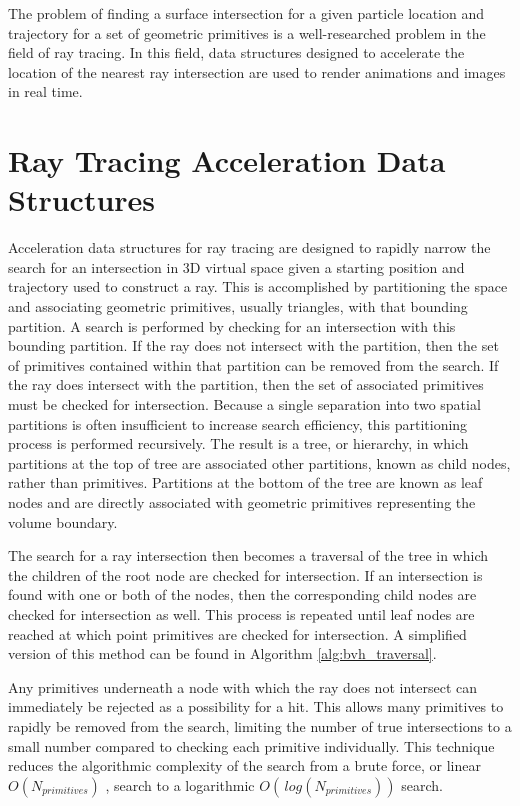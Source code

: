 The problem of finding a surface intersection for a given particle location and
trajectory for a set of geometric primitives is a well-researched problem in
the field of ray tracing. In this field, data structures designed to accelerate
the location of the nearest ray intersection are used to render animations and
images in real time.

\section{Ray Tracing Acceleration Data Structures}

Acceleration data structures for ray tracing are designed to rapidly narrow the
search for an intersection in 3D virtual space given a starting position and
trajectory used to construct a ray. This is accomplished by partitioning the
space and associating geometric primitives, usually triangles, with that
bounding partition. A search is performed by checking for an intersection with
this bounding partition. If the ray does not intersect with the partition, then
the set of primitives contained within that partition can be removed from the
search. If the ray does intersect with the partition, then the set of associated
primitives must be checked for intersection. Because a single separation into
two spatial partitions is often insufficient to increase search efficiency, this
partitioning process is performed recursively. The result is a tree, or
hierarchy, in which partitions at the top of tree are associated other
partitions, known as child nodes, rather than primitives. Partitions at the
bottom of the tree are known as leaf nodes and are directly associated with
geometric primitives representing the volume boundary.

The search for a ray intersection then becomes a traversal of the tree in which
the children of the root node are checked for intersection. If an intersection
is found with one or both of the nodes, then the corresponding child nodes are
checked for intersection as well. This process is repeated until leaf nodes are
reached at which point primitives are checked for intersection. A simplified
version of this method can be found in Algorithm \ref{alg:bvh_traversal}.

Any primitives underneath a node with which the ray does not intersect can
immediately be rejected as a possibility for a hit. This allows many primitives
to rapidly be removed from the search, limiting the number of true intersections
to a small number compared to checking each primitive individually. This
technique reduces the algorithmic complexity of the search from a brute force,
or linear $O(N_{primitives})$ , search to a logarithmic $O(\,
log(N_{primitives}))$ search.


